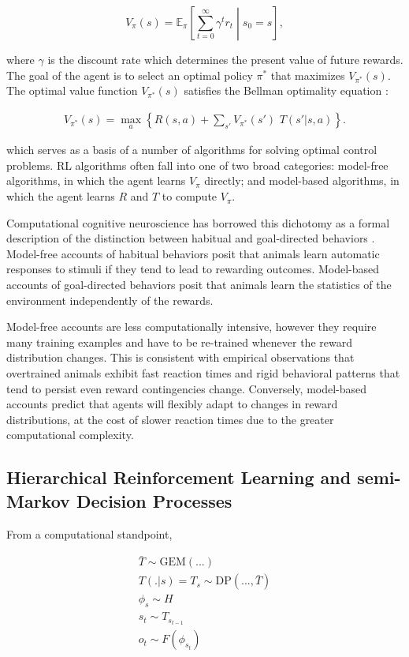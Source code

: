 \documentclass[11pt]{article}
\begin{document}
\[
V_{\pi}(s) = \mathbb{E}_{\pi} \left[  \sum_{t=0}^{\infty} \gamma^{t} r_t \middle| s_0 = s \right] ,
\]

where $\gamma$ is the discount rate which determines the present value of future rewards. The goal of the agent is to select an optimal policy $\pi^*$ that maximizes $V_{\pi^*}(s)$. The optimal value function $V_{\pi^*}(s)$ satisfies the Bellman optimality equation \cite{Bellman1957}:

\begin{align*}
V_{\pi^*}(s) = \max_a  \left\{ R(s,a) + \sum_{s'} V_{\pi^*}(s') \,\, T(s'|s,a) \right\} .
\end{align*}

which serves as a basis of a number of algorithms for solving optimal control problems. RL algorithms often fall into one of two broad categories: model-free algorithms, in which the agent learns $V_\pi$ directly; and model-based algorithms, in which the agent learns $R$ and $T$ to compute $V_\pi$. 

Computational cognitive neuroscience has borrowed this dichotomy as a formal description of the distinction between habitual and goal-directed behaviors \cite{Dolan2013}. Model-free accounts of habitual behaviors posit that animals learn automatic responses to stimuli if they tend to lead to rewarding outcomes. Model-based accounts of goal-directed behaviors posit that animals learn the statistics of the environment independently of the rewards.

Model-free accounts are less computationally intensive, however they require many training examples and have to be re-trained whenever the reward distribution changes. This is consistent with empirical observations that overtrained animals exhibit fast reaction times and rigid behavioral patterns that tend to persist even reward contingencies change. Conversely, model-based accounts predict that agents will flexibly adapt to changes in reward distributions, at the cost of slower reaction times due to the greater computational complexity.

\subsection{Hierarchical Reinforcement Learning and semi-Markov Decision Processes}


From a computational standpoint, 



\begin{align*}
\bar{T} \sim \text{GEM}(...) \\
T(.|s) = T_s \sim \text{DP}(..., \bar{T}) \\
\phi_s \sim H \\
s_t \sim T_{s_{t-1}} \\
o_t \sim F(\phi_{s_t})
\end{align*}
\end{document}
